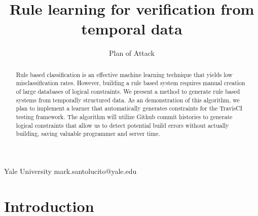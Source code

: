 \documentclass{sigplanconf}
\begin{document}
\setlength{\pdfpageheight}{\paperheight}\setlength{\pdfpagewidth}{\paperwidth}
   




\title{Rule learning for verification from temporal data}
\subtitle{Plan of Attack}

           {Yale University}           {mark.santolucito@yale.edu}

\maketitle

\begin{abstract}
Rule based classification is an effective machine learning technique that yields low misclassification rates.
However, building a rule based system requires manual creation of large databases of logical constraints.
We present a method to generate rule based systems from temporally structured data.
As an demonstration of this algorithm, we plan to implement a learner that automatically generates constraints for the TravisCI testing framework.
The algorithm will utilize Github commit histories to generate logical constraints that allow us to detect potential build errors without actually building, saving valuable programmer and server time.
\end{abstract}



\section{Introduction}
\end{document}

